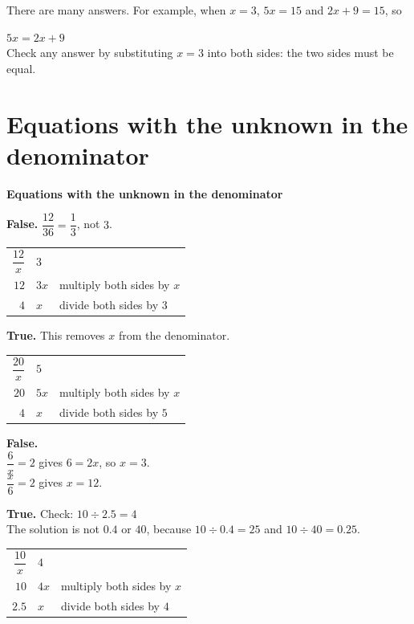 \documentclass[aspectratio=169]{beamer}
\makeatletter
\newcommand{\qtopic}[1]{%
  \section{#1}%
  \begin{frame}
    \vfill
    \begin{center}
      {\usebeamercolor[fg]{structure}\Huge\bfseries #1}
    \end{center}
    \vfill
  \end{frame}%
}
\newcommand{\steps}[1]{%
  \begin{tabular}{@{}r@{${}={}$}l@{\qquad}l@{}}#1\end{tabular}%
}
\newcommand{\by}[1]{{\normalsize #1}}
\makeatother
\begin{document}
  {There are many answers. For example, when $x=3$,
   $5x=15$ and $2x+9=15$, so
   \par\vspace{0.3em}
   $5x=2x+9$\\[0.4em]
   Check any answer by substituting $x=3$ into both sides:
   the two sides must be equal.}

\qtopic{Equations with the unknown in the denominator}

  {\textbf{False.} $\dfrac{12}{36}=\dfrac{1}{3}$, not $3$.
   \par\vspace{0.4em}
   \steps{$\dfrac{12}{x}$ & $3$ & \\[0.95em]
          $12$ & $3x$ & \by{multiply both sides by $x$}\\
          $4$ & $x$ & \by{divide both sides by $3$}}}

  {\textbf{True.} This removes $x$ from the denominator.
   \par\vspace{0.4em}
   \steps{$\dfrac{20}{x}$ & $5$ & \\[0.95em]
          $20$ & $5x$ & \by{multiply both sides by $x$}\\
          $4$ & $x$ & \by{divide both sides by $5$}}}

  {\textbf{False.}\\[0.3em]
   $\dfrac{6}{x}=2$ gives $6=2x$, so $x=3$.\\[0.5em]
   $\dfrac{x}{6}=2$ gives $x=12$.}

  {\textbf{True.} Check: $10\div 2.5=4$\\[0.3em]
   The solution is not $0.4$ or $40$, because $10\div 0.4=25$ and
   $10\div 40=0.25$.
   \par\vspace{0.4em}
   \steps{$\dfrac{10}{x}$ & $4$ & \\[0.95em]
          $10$ & $4x$ & \by{multiply both sides by $x$}\\
          $2.5$ & $x$ & \by{divide both sides by $4$}}}
\end{document}
